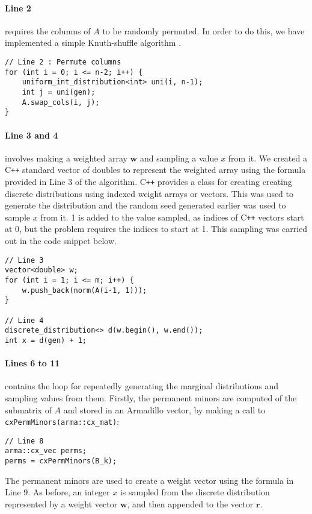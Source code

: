 \documentclass[11pt]{article}
\theoremstyle{theorem}
\theoremstyle{theorem}
\theoremstyle{remark}
\theoremstyle{note}
\theoremstyle{plain}
\theoremstyle{definition}
\begin{document}
\paragraph{Line 2} requires the columns of $A$ to be randomly permuted. In order to do this, we have implemented a simple Knuth-shuffle algorithm \cite{knuth1969}. 
\begin{verbatim}
// Line 2 : Permute columns
for (int i = 0; i <= n-2; i++) {
    uniform_int_distribution<int> uni(i, n-1);
    int j = uni(gen);
    A.swap_cols(i, j);
}
\end{verbatim}
\paragraph{Line 3 and 4} involves making a weighted array $\mathbf{w}$ and sampling a value $x$ from it. We created a C\texttt{++} standard vector of doubles to represent the weighted array using the formula provided in Line 3 of the algorithm. C\texttt{++} provides a class for creating creating discrete distributions using indexed weight arrays or vectors. This was used to generate the distribution and the random seed generated earlier was used to sample $x$ from it. 1 is added to the value sampled, as indices of C\texttt{++} vectors start at 0, but the problem requires the indices to start at 1. This sampling was carried out in the code snippet below.
\begin{verbatim}
// Line 3
vector<double> w;
for (int i = 1; i <= m; i++) {
    w.push_back(norm(A(i-1, 1)));
}

// Line 4
discrete_distribution<> d(w.begin(), w.end());
int x = d(gen) + 1;
\end{verbatim}
\paragraph{Lines 6 to 11} contains the loop for repeatedly generating the marginal distributions and sampling values from them. Firstly, the permanent minors are computed of the submatrix of $A$ and stored in an Armadillo vector, by making a call to \texttt{cxPermMinors(arma::cx_mat)}:
\begin{verbatim}
// Line 8
arma::cx_vec perms;
perms = cxPermMinors(B_k);
\end{verbatim}
The permanent minors are used to create a weight vector using the formula in Line 9. As before, an integer $x$ is sampled from the discrete distribution represented by a weight vector $\mathbf{w}$, and then appended to the vector $\mathbf{r}$.
\end{document}
